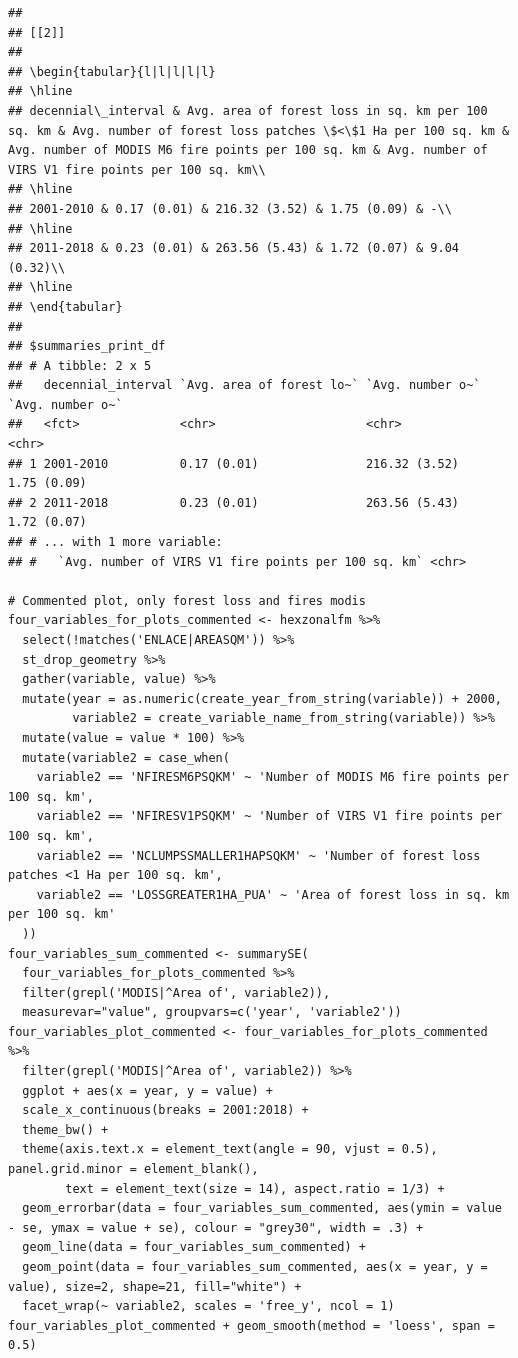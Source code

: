 \documentclass[10pt,landscape,a3paper]{article}
\begin{document}
\begin{verbatim}
## 
## [[2]]
## 
## \begin{tabular}{l|l|l|l|l}
## \hline
## decennial\_interval & Avg. area of forest loss in sq. km per 100 sq. km & Avg. number of forest loss patches \$<\$1 Ha per 100 sq. km & Avg. number of MODIS M6 fire points per 100 sq. km & Avg. number of VIRS V1 fire points per 100 sq. km\\
## \hline
## 2001-2010 & 0.17 (0.01) & 216.32 (3.52) & 1.75 (0.09) & -\\
## \hline
## 2011-2018 & 0.23 (0.01) & 263.56 (5.43) & 1.72 (0.07) & 9.04 (0.32)\\
## \hline
## \end{tabular}
## 
## $summaries_print_df
## # A tibble: 2 x 5
##   decennial_interval `Avg. area of forest lo~` `Avg. number o~` `Avg. number o~`
##   <fct>              <chr>                     <chr>            <chr>           
## 1 2001-2010          0.17 (0.01)               216.32 (3.52)    1.75 (0.09)     
## 2 2011-2018          0.23 (0.01)               263.56 (5.43)    1.72 (0.07)     
## # ... with 1 more variable:
## #   `Avg. number of VIRS V1 fire points per 100 sq. km` <chr>

# Commented plot, only forest loss and fires modis
four_variables_for_plots_commented <- hexzonalfm %>% 
  select(!matches('ENLACE|AREASQM')) %>%
  st_drop_geometry %>% 
  gather(variable, value) %>% 
  mutate(year = as.numeric(create_year_from_string(variable)) + 2000,
         variable2 = create_variable_name_from_string(variable)) %>% 
  mutate(value = value * 100) %>% 
  mutate(variable2 = case_when(
    variable2 == 'NFIRESM6PSQKM' ~ 'Number of MODIS M6 fire points per 100 sq. km',
    variable2 == 'NFIRESV1PSQKM' ~ 'Number of VIRS V1 fire points per 100 sq. km',
    variable2 == 'NCLUMPSSMALLER1HAPSQKM' ~ 'Number of forest loss patches <1 Ha per 100 sq. km',
    variable2 == 'LOSSGREATER1HA_PUA' ~ 'Area of forest loss in sq. km per 100 sq. km'
  ))
four_variables_sum_commented <- summarySE(
  four_variables_for_plots_commented %>%
  filter(grepl('MODIS|^Area of', variable2)),
  measurevar="value", groupvars=c('year', 'variable2'))
four_variables_plot_commented <- four_variables_for_plots_commented %>%
  filter(grepl('MODIS|^Area of', variable2)) %>% 
  ggplot + aes(x = year, y = value) +
  scale_x_continuous(breaks = 2001:2018) + 
  theme_bw() +
  theme(axis.text.x = element_text(angle = 90, vjust = 0.5), panel.grid.minor = element_blank(),
        text = element_text(size = 14), aspect.ratio = 1/3) +
  geom_errorbar(data = four_variables_sum_commented, aes(ymin = value - se, ymax = value + se), colour = "grey30", width = .3) +
  geom_line(data = four_variables_sum_commented) +
  geom_point(data = four_variables_sum_commented, aes(x = year, y = value), size=2, shape=21, fill="white") +
  facet_wrap(~ variable2, scales = 'free_y', ncol = 1)
four_variables_plot_commented + geom_smooth(method = 'loess', span = 0.5)
\end{verbatim}
\end{document}
